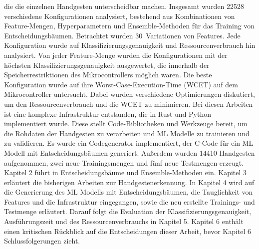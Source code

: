 die die einzelnen Handgesten unterscheidbar machen.
\newline
\newline
Insgesamt wurden 22528 verschiedene Konfigurationen analysiert, bestehend aus Kombinationen von Feature-Mengen, Hyperparametern und Ensemble-Methoden für das Training von Entscheidungsbäumen.
Betrachtet wurden 30~Variationen von Features. Jede Konfiguration wurde auf Klassifizierungsgenauigkeit und Ressourcenverbrauch
hin analysiert. Von jeder Feature-Menge wurden die Konfigurationen mit der höchsten Klassifizierungsgenauigkeit ausgewertet, die innerhalb der Speicherrestriktionen des Mikrocontrollers möglich waren. Die beste
Konfiguration wurde auf ihre Worst-Case-Execution-Time (WCET) auf dem Mikrocontroller untersucht. Dabei wurden verschiedene Optimierungen diskutiert, um den Ressourcenverbrauch und die WCET zu minimieren.
Bei diesen Arbeiten ist eine komplexe Infrastruktur entstanden, die in Rust und Python implementiert wurde. Diese stellt Code-Bibliotheken und Werkzeuge bereit, um die Rohdaten der Handgesten zu verarbeiten und
ML Modelle zu trainieren und zu validieren. Es wurde ein Codegenerator implementiert, der C-Code für ein ML Modell mit Entscheidungsbäumen generiert. Außerdem wurden 14410 Handgesten aufgenommen,
zwei neue Trainingsmengen und fünf neue Testmengen erzeugt.
\newline
\newline
Kapitel 2 führt in Entscheidungsbäume und Ensemble-Methoden ein. Kapitel 3 erläutert die bisherigen Arbeiten zur Handgestenerkennung. In Kapitel 4 wird auf die Generierung des ML Modells mit Entscheidungsbäumen,
die Tauglichkeit von Features und die Infrastruktur eingegangen, sowie die neu erstellte Trainings- und Testmenge erläutert. Darauf folgt die Evaluation der Klassifizierungsgenauigkeit, Ausführungszeit
und des Ressourcenverbrauchs in Kapitel 5. Kapitel 6 enthält einen kritischen Rückblick auf die Entscheidungen dieser Arbeit, bevor Kapitel 6 Schlussfolgerungen zieht.